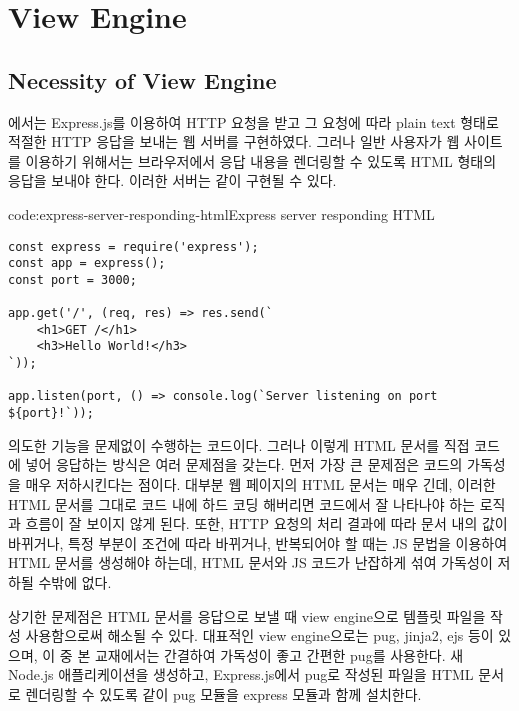 \section{View Engine}\label{sect:view-engine}

\subsection*{Necessity of View Engine}

에서는 Express.js를 이용하여 HTTP 요청을 받고 그 요청에 따라 plain text 형태로 적절한 HTTP 응답을 보내는 웹 서버를 구현하였다. 그러나 일반 사용자가 웹 사이트를 이용하기 위해서는 브라우저에서 응답 내용을 렌더링할 수 있도록 HTML 형태의 응답을 보내야 한다. 이러한 서버는 \과 같이 구현될 수 있다.

\begin{code}{code:express-server-responding-html}{Express server responding HTML}
\begin{verbatim}
const express = require('express');
const app = express();
const port = 3000;

app.get('/', (req, res) => res.send(`
    <h1>GET /</h1>
    <h3>Hello World!</h3>
`));

app.listen(port, () => console.log(`Server listening on port ${port}!`));
\end{verbatim}
\end{code}

\은 의도한 기능을 문제없이 수행하는 코드이다. 그러나 이렇게 HTML 문서를 직접 코드에 넣어 응답하는 방식은 여러 문제점을 갖는다. 먼저 가장 큰 문제점은 코드의 가독성을 매우 저하시킨다는 점이다. 대부분 웹 페이지의 HTML 문서는 매우 긴데, 이러한 HTML 문서를 그대로 코드 내에 하드 코딩 해버리면 코드에서 잘 나타나야 하는 로직과 흐름이 잘 보이지 않게 된다. 또한, HTTP 요청의 처리 결과에 따라 문서 내의 값이 바뀌거나, 특정 부분이 조건에 따라 바뀌거나, 반복되어야 할 때는 JS 문법을 이용하여 HTML 문서를 생성해야 하는데, HTML 문서와 JS 코드가 난잡하게 섞여 가독성이 저하될 수밖에 없다.

상기한 문제점은 HTML 문서를 응답으로 보낼 때 view engine으로 템플릿 파일을 작성 사용함으로써 해소될 수 있다. 대표적인 view engine으로는 pug, jinja2, ejs 등이 있으며, 이 중 본 교재에서는 간결하여 가독성이 좋고 간편한 pug를 사용한다. 새 Node.js 애플리케이션을 생성하고, Express.js에서 pug로 작성된 파일을 HTML 문서로 렌더링할 수 있도록 \와 같이 pug 모듈을 express 모듈과 함께 설치한다.

